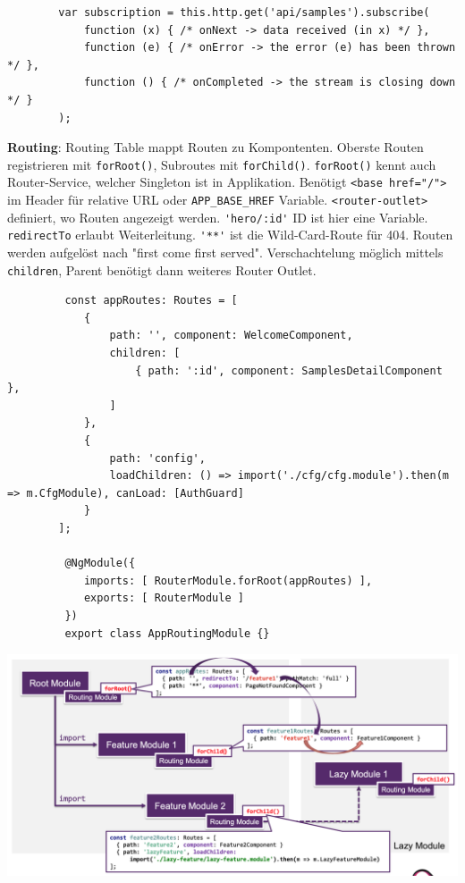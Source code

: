 \documentclass[10pt,landscape]{article}
\begin{document}
\begin{multicols}{3}
        \begin{lstlisting}
        var subscription = this.http.get('api/samples').subscribe(
            function (x) { /* onNext -> data received (in x) */ },
            function (e) { /* onError -> the error (e) has been thrown */ },
            function () { /* onCompleted -> the stream is closing down */ }
        );
        \end{lstlisting}

        \textbf{Routing}: Routing Table mappt Routen zu Kompontenten.
        Oberste Routen registrieren mit \lstinline{forRoot()}, Subroutes mit \lstinline{forChild()}.
        \lstinline{forRoot()} kennt auch Router-Service, welcher Singleton ist in Applikation.
        Benötigt \lstinline{<base href="/">} im Header für relative URL oder \lstinline{APP_BASE_HREF} Variable.
        \lstinline{<router-outlet>} definiert, wo Routen angezeigt werden.
        \lstinline{'hero/:id'} ID ist hier eine Variable.
        \lstinline{redirectTo} erlaubt Weiterleitung.
        \lstinline{'**'} ist die Wild-Card-Route für 404.
        Routen werden aufgelöst nach "first come first served".
        Verschachtelung möglich mittels \lstinline{children}, Parent benötigt dann weiteres Router Outlet.

        \begin{lstlisting}
         const appRoutes: Routes = [
            {
                path: '', component: WelcomeComponent,
                children: [
                    { path: ':id', component: SamplesDetailComponent },
                ]
            },
            {
                path: 'config',
                loadChildren: () => import('./cfg/cfg.module').then(m => m.CfgModule), canLoad: [AuthGuard]
            }
        ];

         @NgModule({
            imports: [ RouterModule.forRoot(appRoutes) ],
            exports: [ RouterModule ]
         })
         export class AppRoutingModule {}
         \end{lstlisting}

        \includegraphics[width=\linewidth]{angular_routing}
    \end{multicols}
\end{document}
